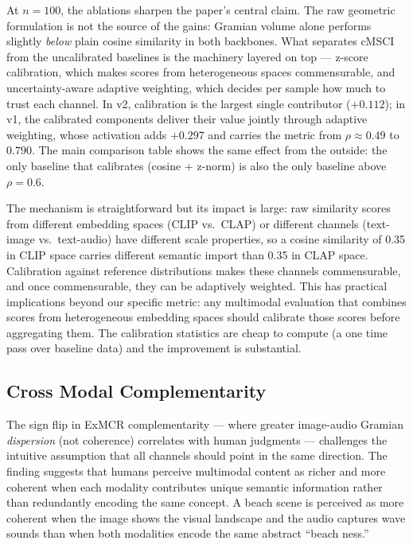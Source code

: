 At $n = 100$, the ablations sharpen the paper's central claim. The raw geometric formulation is not the source of the gains: Gramian volume alone performs slightly \emph{below} plain cosine similarity in both backbones. What separates cMSCI from the uncalibrated baselines is the machinery layered on top — z-score calibration, which makes scores from heterogeneous spaces commensurable, and uncertainty-aware adaptive weighting, which decides per sample how much to trust each channel. In v2, calibration is the largest single contributor ($+0.112$); in v1, the calibrated components deliver their value jointly through adaptive weighting, whose activation adds $+0.297$ and carries the metric from $\rho \approx 0.49$ to $0.790$. The main comparison table shows the same effect from the outside: the only baseline that calibrates (cosine + z-norm) is also the only baseline above $\rho = 0.6$.

The mechanism is straightforward but its impact is large: raw similarity scores from different embedding spaces (CLIP vs.\ CLAP) or different channels (text-image vs.\ text-audio) have different scale properties, so a cosine similarity of 0.35 in CLIP space carries different semantic import than 0.35 in CLAP space. Calibration against reference distributions makes these channels commensurable, and once commensurable, they can be adaptively weighted. This has practical implications beyond our specific metric: any multimodal evaluation that combines scores from heterogeneous embedding spaces should calibrate those scores before aggregating them. The calibration statistics are cheap to compute (a one time pass over baseline data) and the improvement is substantial.

\subsection{Cross Modal Complementarity}\label{sec:complementarity-discussion}

The sign flip in ExMCR complementarity — where greater image-audio Gramian \emph{dispersion} (not coherence) correlates with human judgments — challenges the intuitive assumption that all channels should point in the same direction. The finding suggests that humans perceive multimodal content as richer and more coherent when each modality contributes unique semantic information rather than redundantly encoding the same concept. A beach scene is perceived as more coherent when the image shows the visual landscape and the audio captures wave sounds than when both modalities encode the same abstract ``beach ness.''

